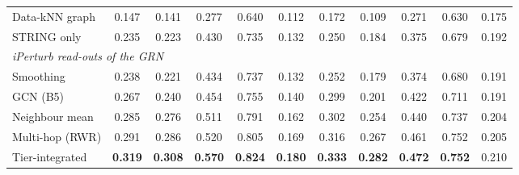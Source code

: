 \begin{tabular}{lccccc@{\hspace{6pt}}ccccc}
\hspace{0.4em}Data-kNN graph & 0.147 & 0.141 & 0.277 & 0.640 & 0.112 & 0.172 & 0.109 & 0.271 & 0.630 & 0.175\\
\hspace{0.4em}STRING only & 0.235 & 0.223 & 0.430 & 0.735 & 0.132 & 0.250 & 0.184 & 0.375 & 0.679 & 0.192\\
\midrule
\multicolumn{11}{l}{\emph{iPerturb read-outs of the GRN}}\\
\hspace{0.4em}Smoothing & 0.238 & 0.221 & 0.434 & 0.737 & 0.132 & 0.252 & 0.179 & 0.374 & 0.680 & 0.191\\
\hspace{0.4em}GCN (B5) & 0.267 & 0.240 & 0.454 & 0.755 & 0.140 & 0.299 & 0.201 & 0.422 & 0.711 & 0.191\\
\hspace{0.4em}Neighbour mean & 0.285 & 0.276 & 0.511 & 0.791 & 0.162 & 0.302 & 0.254 & 0.440 & 0.737 & 0.204\\
\hspace{0.4em}Multi-hop (RWR) & 0.291 & 0.286 & 0.520 & 0.805 & 0.169 & 0.316 & 0.267 & 0.461 & 0.752 & 0.205\\
\hspace{0.4em}Tier-integrated & \textbf{0.319} & \textbf{0.308} & \textbf{0.570} & \textbf{0.824} & \textbf{0.180} & \textbf{0.333} & \textbf{0.282} & \textbf{0.472} & \textbf{0.752} & 0.210\\
\bottomrule
\end{tabular}